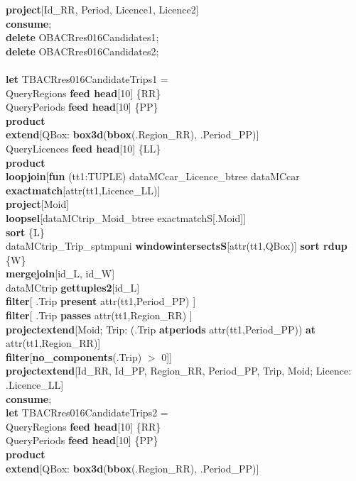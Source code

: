 \documentclass[a4paper]{article}
\newcommand{\op}[1]{\textbf{#1}}
\begin{document}
\begin{scriptsize}
\begin{tabbing}
\>\op{project}[Id\_RR, Period, Licence1, Licence2]\\
\op{consume};\\
\op{delete} OBACRres016Candidates1;\\
\op{delete} OBACRres016Candidates2;\\
\\
\op{let} TBACRres016CandidateTrips1 =\\
\>QueryRegions \op{feed head}[10] \{RR\}\\
\>QueryPeriods \op{feed head}[10] \{PP\}\\
\>\op{product}\\
\>\op{extend}[QBox: \op{box3d}(\op{bbox}(.Region\_RR), .Period\_PP)]\\
\>QueryLicences \op{feed head}[10] \{LL\}\\
\>\op{product}\\
\>\op{loopjoin}[\op{fun} (tt1:TUPLE) dataMCcar\_Licence\_btree dataMCcar \op{exactmatch}[attr(tt1,Licence\_LL)]\\
\>\>\op{project}[Moid]\\
\>\>\op{loopsel}[dataMCtrip\_Moid\_btree exactmatchS[.Moid]]\\
\>\>\op{sort} \{L\}\\
\>\>dataMCtrip\_Trip\_sptmpuni \op{windowintersectsS}[attr(tt1,QBox)] \op{sort rdup} \{W\}\\
\>\>\op{mergejoin}[id\_L, id\_W]\\
\>\>dataMCtrip \op{gettuples2}[id\_L]\\
\>\>\op{filter}[ .Trip \op{present} attr(tt1,Period\_PP) ]\\
\>\>\op{filter}[ .Trip \op{passes}  attr(tt1,Region\_RR) ]\\
\>\>\op{projectextend}[Moid; Trip: (.Trip \op{atperiods} attr(tt1,Period\_PP)) \op{at} attr(tt1,Region\_RR)]\\
\>\>\op{filter}[\op{no\_components}(.Trip) $>$ 0]]\\
\>\op{projectextend}[Id\_RR, Id\_PP, Region\_RR, Period\_PP, Trip, Moid; Licence: .Licence\_LL]\\
\op{consume};\\
\op{let} TBACRres016CandidateTrips2 =\\
\>QueryRegions \op{feed head}[10] \{RR\}\\
\>QueryPeriods \op{feed head}[10] \{PP\}\\
\>\op{product}\\
\>\op{extend}[QBox: \op{box3d}(\op{bbox}(.Region\_RR), .Period\_PP)]\\

\end{tabbing}
\end{scriptsize}
\end{document}
